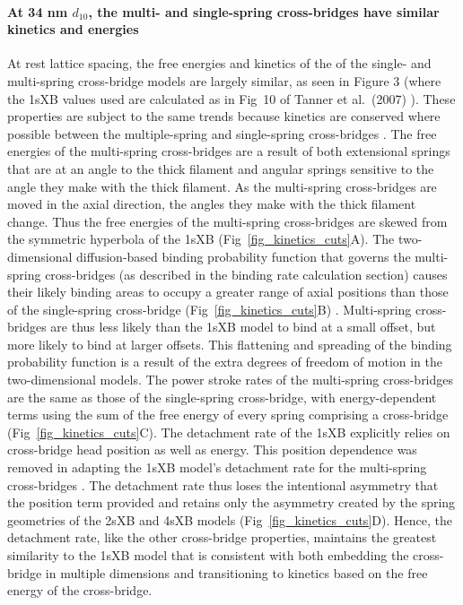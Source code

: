 \documentclass[10pt]{article}
\newcommand{\citep}[1]{\cite{#1}} %
\begin{document}
\paragraph{At 34 nm $d_{10}$, the multi- and single-spring cross-bridges have similar kinetics and energies} %
At rest lattice spacing, the free energies and kinetics of the of the single- and multi-spring cross-bridge models are largely similar, as seen in Figure 3 (where the 1sXB values used are calculated as in Fig~10 of Tanner et al.~(2007) \citep{Tanner2007}).  
These properties are subject to the same trends because kinetics are conserved where possible between the multiple-spring and single-spring cross-bridges \citep{Pate1989}.
The free energies of the multi-spring cross-bridges are a result of both extensional springs that are at an angle to the thick filament and angular springs sensitive to the angle they make with the thick filament. 
As the multi-spring cross-bridges are moved in the axial direction, the angles they make with the thick filament change. 
Thus the free energies of the multi-spring cross-bridges are skewed from the symmetric hyperbola of the 1sXB (Fig~\ref{fig_kinetics_cuts}A).
The two-dimensional diffusion-based binding probability function that governs the multi-spring cross-bridges (as described in the binding rate calculation section) causes their likely binding areas to occupy a greater range of axial positions than those of the single-spring cross-bridge (Fig~\ref{fig_kinetics_cuts}B) \citep{BergBook, DillBook}.
Multi-spring cross-bridges are thus less likely than the 1sXB model to bind at a small offset, but more likely to bind at larger offsets. 
This flattening and spreading of the binding probability function is a result of the extra degrees of freedom of motion in the two-dimensional models. 
The power stroke rates of the multi-spring cross-bridges are the same as those of the single-spring cross-bridge, with energy-dependent terms using the sum of the free energy of every spring comprising a cross-bridge (Fig~\ref{fig_kinetics_cuts}C). 
The detachment rate of the 1sXB explicitly relies on cross-bridge head position as well as energy.
This position dependence was removed in adapting the 1sXB model's detachment rate for the multi-spring cross-bridges . 
The detachment rate thus loses the intentional asymmetry that the position term provided and retains only the asymmetry created by the spring geometries of the 2sXB and 4sXB models (Fig~\ref{fig_kinetics_cuts}D). 
Hence, the detachment rate, like the other cross-bridge properties, maintains the greatest similarity to the 1sXB model that is consistent with both embedding the cross-bridge in multiple dimensions and transitioning to kinetics based on the free energy of the cross-bridge. 
\end{document}
